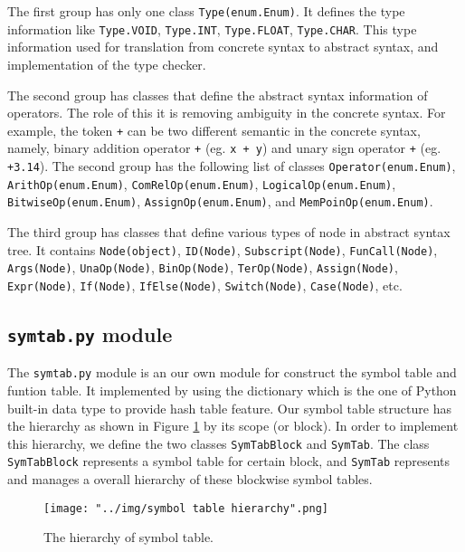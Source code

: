 \documentclass{article}
\newcommand{\code}[1]{\texttt{#1}}
\begin{document}
	The first group has only one class \code{Type(enum.Enum)}. It defines the type information like \code{Type.VOID}, \code{Type.INT}, \code{Type.FLOAT}, \code{Type.CHAR}. This type information used for translation from concrete syntax to abstract syntax, and implementation of the type checker.
	
	The second group has classes that define the abstract syntax information of operators. The role of this it is removing ambiguity in the concrete syntax. For example, the token \code{+} can be two different semantic in the concrete syntax, namely, binary addition operator \code{+} (eg. \code{x + y}) and unary sign operator \code{+} (eg. \code{+3.14}). The second group has the following list of classes \code{Operator(enum.Enum)}, \code{ArithOp(enum.Enum)}, \code{ComRelOp(enum.Enum)}, \code{LogicalOp(enum.Enum)}, \code{BitwiseOp(enum.Enum)}, \code{AssignOp(enum.Enum)}, and \code{MemPoinOp(enum.Enum)}.
	
	The third group has classes that define various types of node in abstract syntax tree. It contains \code{Node(object)}, \code{ID(Node)}, \code{Subscript(Node)}, \code{FunCall(Node)}, \code{Args(Node)}, \code{UnaOp(Node)}, \code{BinOp(Node)}, \code{TerOp(Node)}, \code{Assign(Node)}, \code{Expr(Node)}, \code{If(Node)}, \code{IfElse(Node)}, \code{Switch(Node)}, \code{Case(Node)}, etc.
	
	\subsection{\code{symtab.py} module}
	
	The \code{symtab.py} module is an our own module for construct the symbol table and funtion table. It implemented by using the dictionary which is the one of Python built-in data type to provide hash table feature. Our symbol table structure has the hierarchy as shown in Figure \ref{fig: hierarchy of symbol table} by its scope (or block). In order to implement this hierarchy, we define the two classes \code{SymTabBlock} and \code{SymTab}. The class \code{SymTabBlock} represents a symbol table for certain block, and \code{SymTab} represents and manages a overall hierarchy of these blockwise symbol tables.
	
	\begin{figure}[ht]
		\centering
		\texttt{[image: "../img/symbol table hierarchy".png]}
		\caption{The hierarchy of symbol table. \cite{Aho:2006:CPT:1177220}}
		\label{fig: hierarchy of symbol table}
	\end{figure}
	
\end{document}
